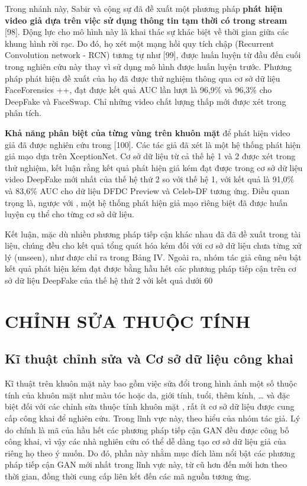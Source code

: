 \documentclass{article}
\begin{document}
Trong nhánh này, Sabir và cộng sự đã đề xuất một phương pháp \textbf{phát hiện video giả dựa trên việc sử dụng thông tin tạm thời có trong stream} [98]. Động lực cho mô hình này là khai thác sự khác biệt về thời gian giữa các khung hình rời rạc. Do đó, họ xét một mạng hồi quy tích chập (Recurrent Convolution network - RCN) tương tự như [99], được huấn luyện từ đầu đến cuối trong nghiên cứu này thay vì sử dụng mô hình được huấn luyện trước. Phương pháp phát hiện đề xuất của họ đã được thử nghiệm thông qua cơ sở dữ liệu FaceForensics ++, đạt được kết quả AUC lần lượt là 96,9\% và 96,3\% cho DeepFake và FaceSwap. Chỉ những video chất lượng thấp mới được xét trong phân tích.

\textbf{Khả năng phân biệt của từng vùng trên khuôn mặt} để phát hiện video giả đã được nghiên cứu trong [100]. Các tác giả đã xét là một hệ thống phát hiện giả mạo dựa trên XceptionNet. Cơ sở dữ liệu từ cả thế hệ 1 và 2 được xét trong thử nghiệm, kết luận rằng kết quả phát hiện giả kém đạt được trong cơ sở dữ liệu video DeepFake mới nhất của thế hệ thứ 2 so với thế hệ 1, với kết quả là 91,0\% và 83,6\% AUC cho dữ liệu DFDC Preview và Celeb-DF tương ứng. Điều quan trọng là, ngược với , một hệ thống phát hiện giả mạo riêng biệt đã được huấn luyện cụ thể cho từng cơ sở dữ liệu.

Kết luận, mặc dù nhiều phương pháp tiếp cận khác nhau đã đã đề xuất trong tài liệu, chúng đều cho kết quả tổng quát hóa kém đối với cơ sở dữ liệu chưa từng xử lý (unseen), như được chỉ ra trong Bảng IV. Ngoài ra, nhóm tác giả cũng nêu bật kết quả phát hiện kém đạt được bằng hầu hết các phương pháp tiếp cận trên cơ sở dữ liệu DeepFake của thế hệ thứ 2 với kết quả dưới 60%

\section{CHỈNH SỬA THUỘC TÍNH}

\subsection{Kĩ thuật chỉnh sửa và Cơ sở dữ liệu công khai}

Kĩ thuật trên khuôn mặt này bao gồm việc sửa đổi trong hình ảnh một số thuộc tính của khuôn mặt như màu tóc hoặc da, giới tính, tuổi, thêm kính, … và đặc biệt đối với các chỉnh sửa thuộc tính khuôn mặt , rất ít cơ sở dữ liệu được cung cấp công khai để nghiên cứu. Trong lĩnh vực này, theo hiểu của nhóm tác giả. Lý do chính là mã của hầu hết các phương pháp tiếp cận GAN đều được công bố công khai, vì vậy các nhà nghiên cứu có thể dễ dàng tạo cơ sở dữ liệu giả của riêng họ theo ý muốn. Do đó, phần này nhằm mục đích làm nổi bật các phương pháp tiếp cận GAN mới nhất trong lĩnh vực này, từ cũ hơn đến mới hơn theo thời gian, đồng thời cung cấp liên kết đến các mã nguồn tương ứng.
\end{document}
